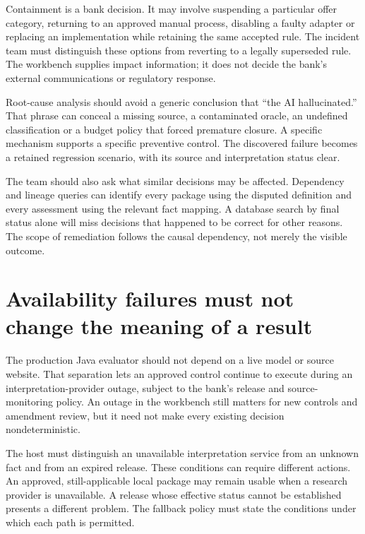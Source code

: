 \documentclass[12pt,a4paper,oneside,openany]{book}
\begin{document}
Containment is a bank decision. It may involve suspending a particular offer
category, returning to an approved manual process, disabling a faulty adapter or
replacing an implementation while retaining the same accepted rule. The incident
team must distinguish these options from reverting to a legally superseded rule.
The workbench supplies impact information; it does not decide the bank's external
communications or regulatory response.

Root-cause analysis should avoid a generic conclusion that ``the AI hallucinated.''
That phrase can conceal a missing source, a contaminated oracle, an undefined
classification or a budget policy that forced premature closure. A specific
mechanism supports a specific preventive control. The discovered failure becomes
a retained regression scenario, with its source and interpretation status clear.

The team should also ask what similar decisions may be affected. Dependency and
lineage queries can identify every package using the disputed definition and
every assessment using the relevant fact mapping. A database search by final
status alone will miss decisions that happened to be correct for other reasons.
The scope of remediation follows the causal dependency, not merely the visible
outcome.

\section{Availability failures must not change the meaning of a result}
\label{merge:M10:09}


The production Java evaluator should not depend on a live model or source website.
That separation lets an approved control continue to execute during an
interpretation-provider outage, subject to the bank's release and source-monitoring
policy. An outage in the workbench still matters for new controls and amendment
review, but it need not make every existing decision nondeterministic.

The host must distinguish an unavailable interpretation service from an unknown
fact and from an expired release. These conditions can require different actions.
An approved, still-applicable local package may remain usable when a research
provider is unavailable. A release whose effective status cannot be established
presents a different problem. The fallback policy must state the conditions under
which each path is permitted.
\end{document}
